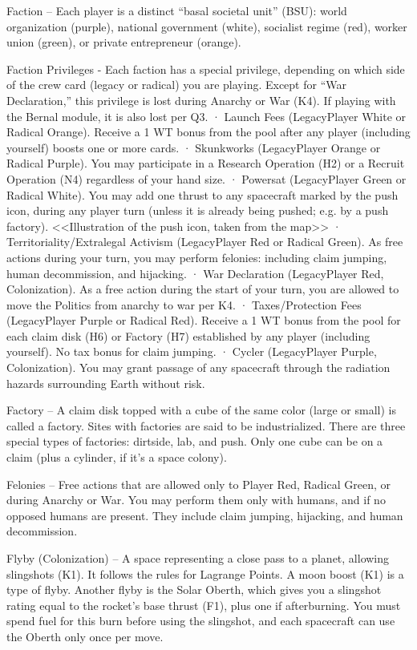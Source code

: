 \documentclass[a4paper]{book}
\begin{document}
Faction – Each player is a distinct “basal societal unit” (BSU): world organization (purple), national government (white), socialist regime (red), worker union (green), or private entrepreneur (orange).

Faction Privileges - Each faction has a special privilege, depending on which side of the crew card (legacy or radical) you are playing. Except for “War Declaration,” this privilege is lost during Anarchy or War (K4). If playing with the Bernal module, it is also lost per Q3.
·   	Launch Fees (LegacyPlayer White or Radical Orange). Receive a 1 WT bonus from the pool after any player (including yourself) boosts one or more cards.
·   	Skunkworks (LegacyPlayer Orange or Radical Purple). You may participate in a Research Operation (H2) or a Recruit Operation (N4) regardless of your hand size.
·   	Powersat (LegacyPlayer Green or Radical White). You may add one thrust to any spacecraft marked by the push icon, during any player turn (unless it is already being pushed; e.g. by a push factory).  <<Illustration of the push icon, taken from the map>>
·   	Territoriality/Extralegal Activism (LegacyPlayer Red or Radical Green). As free actions during your turn, you may perform felonies: including claim jumping, human decommission, and hijacking.
·       War Declaration (LegacyPlayer Red, Colonization). As a free action during the start of your turn, you are allowed to move the Politics from anarchy to war per K4.
·   	Taxes/Protection Fees (LegacyPlayer Purple or Radical Red). Receive a 1 WT bonus from the pool for each claim disk (H6) or Factory (H7) established by any player (including yourself). No tax bonus for claim jumping.
·   	Cycler (LegacyPlayer Purple, Colonization). You may grant passage of any spacecraft through the radiation hazards surrounding Earth without risk.

Factory – A claim disk topped with a cube of the same color (large or small) is called a factory. Sites with factories are said to be industrialized. There are three special types of factories: dirtside, lab, and push. Only one cube can be on a claim (plus a cylinder, if it’s a space colony).

Felonies – Free actions that are allowed only to Player Red, Radical Green, or during Anarchy or War. You may perform them only with humans, and if no opposed humans are present. They include claim jumping, hijacking, and human decommission.

Flyby (Colonization) – A space representing a close pass to a planet, allowing slingshots (K1). It follows the rules for Lagrange Points. A moon boost (K1) is a type of flyby. Another flyby is the Solar Oberth, which gives you a slingshot rating equal to the rocket’s base thrust (F1), plus one if afterburning. You must spend fuel for this burn before using the slingshot, and each spacecraft can use the Oberth only once per move. 
\end{document}

